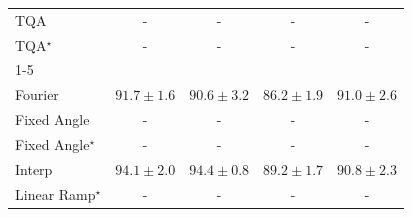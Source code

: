 \begin{tabular}{l|cccc|}
TQA & {\cellcolor[HTML]{000000}} \color[HTML]{F1F1F1} {\cellcolor{white}} \color{black} - & {\cellcolor[HTML]{000000}} \color[HTML]{F1F1F1} {\cellcolor{white}} \color{black} - & {\cellcolor[HTML]{000000}} \color[HTML]{F1F1F1} {\cellcolor{white}} \color{black} - & {\cellcolor[HTML]{000000}} \color[HTML]{F1F1F1} {\cellcolor{white}} \color{black} - \\
TQA$^\star$ & {\cellcolor[HTML]{000000}} \color[HTML]{F1F1F1} {\cellcolor{white}} \color{black} - & {\cellcolor[HTML]{000000}} \color[HTML]{F1F1F1} {\cellcolor{white}} \color{black} - & {\cellcolor[HTML]{000000}} \color[HTML]{F1F1F1} {\cellcolor{white}} \color{black} - & {\cellcolor[HTML]{000000}} \color[HTML]{F1F1F1} {\cellcolor{white}} \color{black} - \\
\cline{1-5}
\multicolumn{5}{c}{\rule{0pt}{8pt}PP} \\
\midrule
Fourier & {\cellcolor[HTML]{369D54}} \color[HTML]{F1F1F1} $91.7\pm 1.6$ & {\cellcolor[HTML]{45AD5F}} \color[HTML]{F1F1F1} $90.6\pm 3.2$ & {\cellcolor[HTML]{A2D88A}} \color[HTML]{000000} $86.2\pm 1.9$ & {\cellcolor[HTML]{3FA85B}} \color[HTML]{F1F1F1} $91.0\pm 2.6$ \\
Fixed Angle & {\cellcolor[HTML]{000000}} \color[HTML]{F1F1F1} {\cellcolor{white}} \color{black} - & {\cellcolor[HTML]{000000}} \color[HTML]{F1F1F1} {\cellcolor{white}} \color{black} - & {\cellcolor[HTML]{000000}} \color[HTML]{F1F1F1} {\cellcolor{white}} \color{black} - & {\cellcolor[HTML]{000000}} \color[HTML]{F1F1F1} {\cellcolor{white}} \color{black} - \\
Fixed Angle$^\star$ & {\cellcolor[HTML]{000000}} \color[HTML]{F1F1F1} {\cellcolor{white}} \color{black} - & {\cellcolor[HTML]{000000}} \color[HTML]{F1F1F1} {\cellcolor{white}} \color{black} - & {\cellcolor[HTML]{000000}} \color[HTML]{F1F1F1} {\cellcolor{white}} \color{black} - & {\cellcolor[HTML]{000000}} \color[HTML]{F1F1F1} {\cellcolor{white}} \color{black} - \\
Interp & {\cellcolor[HTML]{187B3F}} \color[HTML]{F1F1F1} $94.1\pm 2.0$ & {\cellcolor[HTML]{15793E}} \color[HTML]{F1F1F1} $94.4\pm 0.8$ & {\cellcolor[HTML]{64BC6F}} \color[HTML]{F1F1F1} $89.2\pm 1.7$ & {\cellcolor[HTML]{42AB5D}} \color[HTML]{F1F1F1} $90.8\pm 2.3$ \\
Linear Ramp$^\star$ & {\cellcolor[HTML]{000000}} \color[HTML]{F1F1F1} {\cellcolor{white}} \color{black} - & {\cellcolor[HTML]{000000}} \color[HTML]{F1F1F1} {\cellcolor{white}} \color{black} - & {\cellcolor[HTML]{000000}} \color[HTML]{F1F1F1} {\cellcolor{white}} \color{black} - & {\cellcolor[HTML]{000000}} \color[HTML]{F1F1F1} {\cellcolor{white}} \color{black} - \\

\end{tabular}
